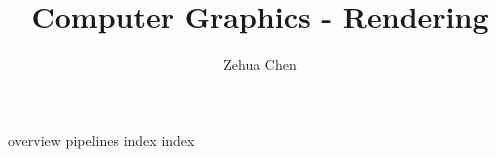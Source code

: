 \documentclass[letterpaper, 11pt]{report}
\title{Computer Graphics - Rendering}
\author{Zehua Chen}
\begin{document}
  \maketitle
  \tableofcontents

  {overview}
  {pipelines}
  {index}
  {index}
\end{document}
